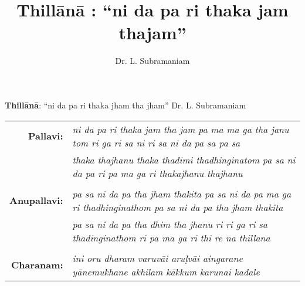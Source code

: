 




\title{Thill\=an\=a : ``ni da pa ri thaka jam thajam''}
\author{Dr. L. Subramaniam}



\textbf{Thill\=an\=a}: ``ni da pa ri thaka jham tha jham'' \hfill Dr. L. Subramaniam


\vspace{0.25 in}

\begin{tabular}{rl}
\textbf{Pallavi:}
& \emph{ni da pa ri thaka jam tha jam pa ma ma ga tha janu tom ri ga ri sa ni ri sa ni da pa sa pa sa}\\
& \emph{thaka thajhanu thaka thadimi thadhinginatom pa sa ni da pa ri pa ma ga ri thakajhanu thajhanu}\\
&\\
 
\textbf{Anupallavi:} 
& \emph{pa sa ni da pa tha jham thakita pa sa ni da pa ma ga ri thadhinginathom pa sa ni da pa tha jham thakita}\\
& \emph{pa sa ni da pa tha dhim tha jhanu ri ri ga ri sa thadinginathom ri pa ma ga ri thi re na thillana}\\
&\\

\textbf{Charanam:}
& \emph{ini oru dharam varuv\=ai aru\d{l}v\=ai aingarane y\=anemukhane akhilam k\=akkum karunai kadale}
\end{tabular}

